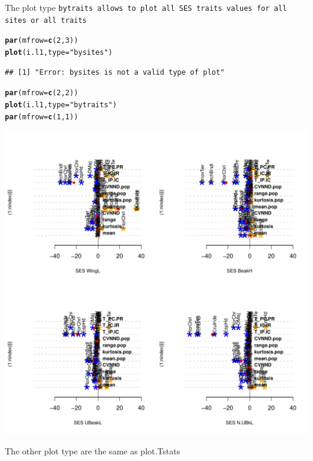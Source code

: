 \documentclass[12pt]{article}\usepackage[]{graphicx}\usepackage[]{color}
\makeatletter
\def\maxwidth{ %
  \ifdim\Gin@nat@width>\linewidth
    \linewidth
  \else
    \Gin@nat@width
  \fi
}
\newcommand{\hlnum}[1]{\textcolor[rgb]{0.686,0.059,0.569}{#1}}%
\newcommand{\hlstr}[1]{\textcolor[rgb]{0.192,0.494,0.8}{#1}}%
\newcommand{\hlstd}[1]{\textcolor[rgb]{0.345,0.345,0.345}{#1}}%
\newcommand{\hlkwc}[1]{\textcolor[rgb]{0.333,0.667,0.333}{#1}}%
\newcommand{\hlkwd}[1]{\textcolor[rgb]{0.737,0.353,0.396}{\textbf{#1}}}%
\newenvironment{kframe}{%
 \def\at@end@of@kframe{}%
 \ifinner\ifhmode%
  \def\at@end@of@kframe{\end{minipage}}%
  \begin{minipage}{\columnwidth}%
 \fi\fi%
 \def\FrameCommand##1{\hskip\@totalleftmargin \hskip-\fboxsep
 \colorbox{shadecolor}{##1}\hskip-\fboxsep
     \hskip-\linewidth \hskip-\@totalleftmargin \hskip\columnwidth}%
 \MakeFramed {\advance\hsize-\width
   \@totalleftmargin\z@ \linewidth\hsize
   \@setminipage}}%
 {\par\unskip\endMakeFramed%
 \at@end@of@kframe}
\newenvironment{knitrout}{}{} %
\makeatother
\begin{document}
The plot type \tt{bytraits} allows to plot all SES traits values for all sites or all traits
\begin{knitrout}
\color{fgcolor}\begin{kframe}
\begin{alltt}
\hlkwd{par}\hlstd{(}\hlkwc{mfrow}\hlstd{=}\hlkwd{c}\hlstd{(}\hlnum{2}\hlstd{,}\hlnum{3}\hlstd{))}
\hlkwd{plot}\hlstd{(i.l1,}\hlkwc{type}\hlstd{=}\hlstr{"bysites"}\hlstd{)}
\end{alltt}
\begin{verbatim}
## [1] "Error: bysites is not a valid type of plot"
\end{verbatim}
\begin{alltt}
\hlkwd{par}\hlstd{(}\hlkwc{mfrow}\hlstd{=}\hlkwd{c}\hlstd{(}\hlnum{2}\hlstd{,}\hlnum{2}\hlstd{))}
\hlkwd{plot}\hlstd{(i.l1,}\hlkwc{type}\hlstd{=}\hlstr{"bytraits"}\hlstd{)}
\hlkwd{par}\hlstd{(}\hlkwc{mfrow}\hlstd{=}\hlkwd{c}\hlstd{(}\hlnum{1}\hlstd{,}\hlnum{1}\hlstd{))}
\end{alltt}
\end{kframe}
\includegraphics[width=\maxwidth]{figure/unnamed-chunk-42} 

\end{knitrout}

The other plot type are the same as plot.Tstats
\end{document}
